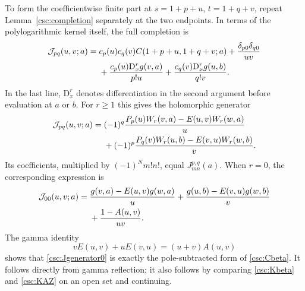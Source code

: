 \documentclass[11pt,a4paper]{article}
\numberwithin{equation}{section}
\theoremstyle{definition}
\newcommand{\D}{\mathrm D}
\begin{document}
To form the coefficientwise finite part at $s=1+p+u$, $t=1+q+v$, repeat Lemma~\ref{csc:completion} separately at the two endpoints. In terms of the polylogarithmic kernel itself, the full completion is
\begin{align}
\mathcal J_{pq}(u,v;a)={}&c_p(u)c_q(v)C(1+p+u,1+q+v;a)
+\frac{\delta_{p0}\delta_{q0}}{uv}\notag\\
&+\frac{c_p(u)\D_x^rg(v,a)}{p!u}
+\frac{c_q(v)\D_x^rg(u,b)}{q!v}.\label{csc:Jfullcompletion}
\end{align}
In the last line, $\D_x^r$ denotes differentiation in the second argument before evaluation at $a$ or $b$. For $r\ge1$ this gives the holomorphic generator
\begin{align}
\mathcal J_{pq}(u,v;a)={}&(-1)^q
\frac{P_p(u)W_r(v,a)-E(u,v)W_r(w,a)}u\notag\\
&+(-1)^p
\frac{P_q(v)W_r(u,b)-E(v,u)W_r(w,b)}v.\label{csc:Jgenerator}
\end{align}
Its coefficients, multiplied by $(-1)^Nm!n!$, equal $J_{mn}^{p,q}(a)$. When $r=0$, the corresponding expression is
\begin{align}
\mathcal J_{00}(u,v;a)={}&
\frac{g(v,a)-E(u,v)g(w,a)}u
+\frac{g(u,b)-E(v,u)g(w,b)}v\notag\\
&+\frac{1-A(u,v)}{uv}.\label{csc:Jgenerator0}
\end{align}
The gamma identity
\begin{equation}\label{csc:EA}
vE(u,v)+uE(v,u)=(u+v)A(u,v)
\end{equation}
shows that \eqref{csc:Jgenerator0} is exactly the pole-subtracted form of \eqref{csc:Cbeta}. It follows directly from gamma reflection; it also follows by comparing \eqref{csc:Kbeta} and \eqref{csc:KAZ} on an open set and continuing.
\end{document}
